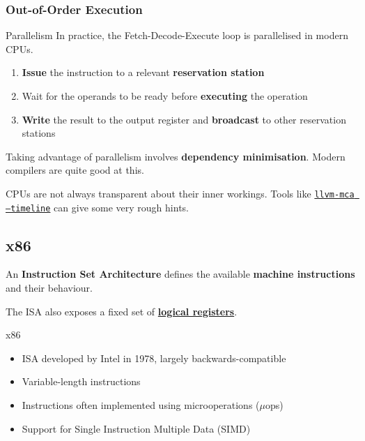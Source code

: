 \documentclass{article}
\begin{document}
\subsubsection{Out-of-Order Execution}
\begin{block}{Parallelism}
	In practice, the Fetch-Decode-Execute loop is parallelised in modern CPUs.

	\begin{enumerate}
	\item \textbf{Issue} the instruction to a relevant \textbf{reservation station}
	\item Wait for the operands to be ready before \textbf{executing} the operation
	\item \textbf{Write} the result to the output register and \textbf{broadcast} to other reservation stations
	\end{enumerate}
\end{block}

Taking advantage of parallelism involves \textbf{dependency minimisation}. Modern compilers are quite good at this.

CPUs are not always transparent about their inner workings. Tools like \href{https://godbolt.org/z/8P6jKv81c}{\texttt{llvm-mca --timeline}} can give some very rough hints.



\subsection{x86}
An \textbf{Instruction Set Architecture} defines the available \textbf{machine instructions} and their behaviour.

The ISA also exposes a fixed set of \href{https://en.wikibooks.org/wiki/X86_Assembly/X86_Architecture}{\textbf{logical registers}}.

\begin{block}{x86}
	\begin{itemize}
	\item ISA developed by Intel in 1978, largely backwards-compatible
	\item Variable-length instructions%
	\item Instructions often implemented using microoperations ($\mu$ops)
	\item Support for Single Instruction Multiple Data (SIMD)
	\end{itemize}
\end{block}
\end{document}
